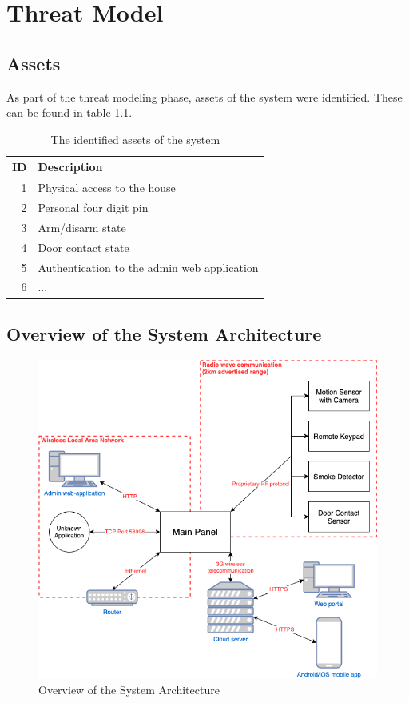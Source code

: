 \chapter{Threat Model} \label{ch:threat-model}
\section{Assets}
As part of the threat modeling phase, assets of the system were identified. These can be found in table \ref{tb:assets}.
\begin{table}[!ht]
    \centering
    \begin{tabular}{r l}
        \hline
        \textbf{ID} & \textbf{Description} \\ \hline
        1  & Physical access to the house \\
        2  & Personal four digit pin \\
        3  & Arm/disarm state \\
        4  & Door contact state \\
        5  & Authentication to the admin web application \\
        6  & ... \\
        \hline
    \end{tabular}
    \caption{The identified assets of the system}
    \label{tb:assets}
\end{table}

\section{Overview of the System Architecture}
\begin{figure}[!ht]
    \centering
    \includegraphics[width=\textwidth]{images/system-overview.png}
    \caption{Overview of the System Architecture}
    \label{fig:system-overview}
\end{figure}
